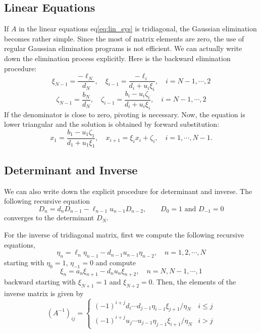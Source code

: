 \subsection{Linear Equations}
If $A$ in the linear equations eq\ref{eq:lin_sys} is tridiagonal, the Gaussian elimination becomes rather simple. Since the most of matrix elements are zero, the use of regular Gaussian elimination programs is not efficient.  We can actually write down the elimination process explicitly. Here is the backward elimination procedure:
\begin{equation}
\xi_{N-1} = \frac{-\ell_{N}}{d_{N}}, \quad \xi_{i-1} = \frac{-\ell_{i}}{d_{i} + u_{i} \xi_{i}},\quad  i=N-1, \cdots, 2
\end{equation} 
\begin{equation}
\zeta_{N-1} = \frac{b_N}{d_N}, \quad \zeta_{i-1} = \frac{b_{i}-u_{i} \zeta_{i}}{d_{i} + u_{i} \xi_{i}}, \quad i=N-1, \cdots, 2
\end{equation} 
If the denominator is close to zero, pivoting is necessary.
Now, the equation is lower triangular and the solution is obtained by forward substitution:
\begin{equation}
x_1 = \frac{b_1-u_1 \zeta_1}{d_1+u_1 \xi_1}, \quad x_{i+1} = \xi_i x_i + \zeta_i, \quad i=1, \cdots , N-1.
\end{equation}

\subsection{Determinant and Inverse}

We can also write down the explicit procedure for determinant and inverse.
The following recursive equation
\begin{equation}
D_n = d_n D_{n-1} - \ell_{n-1} u_{n-1} D_{n-2}, \qquad D_0=1 \text{  and  } D_{-1}=0
\end{equation}
converges to the determinant $D_N$.

For the inverse of tridiagonal matrix, first we compute the following recursive equations, 
\begin{equation}
\eta_n = \ell_n \eta_{n-1} - d_{n-1} u_{n-1} \eta_{n-2}, \quad n=1,2,\cdots, N
\end{equation}
starting with 
$\eta_0=1$, $\eta_{-1}=0$ and compute
\begin{equation}
\xi_n = a_n \xi_{n+1} - d_n u_n \xi_{n+2}, \quad n=N, N-1, \cdots, 1
\end{equation}
backward starting with $\xi_{N+1}=1$ and $\xi_{N+2}=0$.
Then, the elements of the inverse matrix is given by
\begin{equation}
(A^{-1})_{ij} = \begin{cases}
(-1)^{i+j} d_i \cdots d_{j-1} \eta_{i-1}\xi_{j+1}/\eta_N & i \leq j \\[8pt]
(-1)^{i+j} u_j \cdots u_{j-1} \eta_{j-1}\xi_{i+1}/\eta_N & i > j 
\end{cases}
\end{equation}

